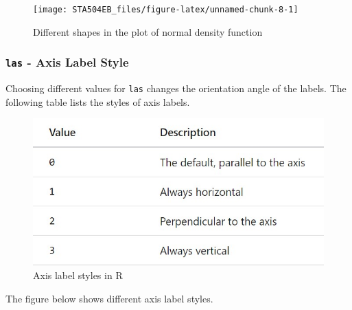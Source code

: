 \documentclass[
]{book}
\begin{document}
\begin{figure}

{\centering \texttt{[image: STA504EB\_files/figure-latex/unnamed-chunk-8-1]} 

}

\caption{Different shapes in the plot of normal density function}\label{fig:unnamed-chunk-8}
\end{figure}

\hypertarget{las---axis-label-style}{%
\subsubsection{\texorpdfstring{\texttt{las} - Axis Label Style}{las - Axis Label Style}}\label{las---axis-label-style}}

Choosing different values for \texttt{las} changes the orientation angle of the labels. The following table lists the styles of axis labels.

\begin{figure}

{\centering \includegraphics[width=0.55\linewidth]{img01/w01-las} 

}

\caption{Axis label styles in R}\label{fig:unnamed-chunk-9}
\end{figure}

The figure below shows different axis label styles.
\end{document}
